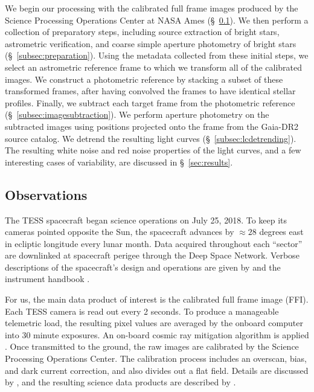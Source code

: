 \documentclass[12pt,twocolumn,tighten]{aastex62}
\begin{document}
We begin our processing with the calibrated full frame images produced
by the Science Processing Operations Center at NASA Ames
(\S~\ref{subsec:observations}).  We then perform a collection of
preparatory steps, including source extraction of bright stars,
astrometric verification, and coarse simple aperture photometry of
bright stars (\S~\ref{subsec:preparation}).  Using the metadata
collected from these initial steps, we select an astrometric reference
frame to which we transform all of the calibrated images.  We
construct a photometric reference by stacking a subset of these
transformed frames, after having convolved the frames to have
identical stellar profiles. Finally, we subtract each target frame
from the photometric reference (\S~\ref{subsec:imagesubtraction}).  We
perform aperture photometry on the subtracted images using positions
projected onto the frame from the Gaia-DR2 source catalog.  We detrend
the resulting light curves (\S~\ref{subsec:lcdetrending}).  The
resulting white noise and red noise properties of the light curves,
and a few interesting cases of variability, are discussed in
\S~\ref{sec:results}.


\subsection{Observations}
\label{subsec:observations}


The TESS spacecraft began science operations on July 25, 2018.  To
keep its cameras pointed opposite the Sun, the spacecraft advances by
$\approx$$28$ degrees east in ecliptic longitude every lunar month.
Data acquired throughout each ``sector'' are downlinked at spacecraft
perigee through the Deep Space Network.  Verbose descriptions of the
spacecraft's design and operations are given by
\citet{ricker_transiting_2015} and the instrument handbook
\citep{vanderspek_2018}.

For us, the main data product of interest is the calibrated full frame
image (FFI).  Each TESS camera is read out every 2 seconds.  To
produce a manageable telemetric load, the resulting pixel values are
averaged by the onboard computer into 30 minute exposures. An on-board
cosmic ray mitigation algorithm is applied \citep[][\S
5.1]{vanderspek_2018}. Once transmitted to the ground, the raw images
are calibrated by the Science Processing Operations Center.  The
calibration process includes an overscan, bias, and dark current
correction, and also divides out a flat field.  Details are discussed
by \citet{clarke_kepler_2017}, and the resulting science data products
are described by \citet{tess_data_product_description_2018}.
\end{document}
